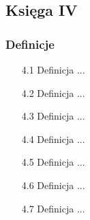 %

\subsection{Księga IV}
\subsubsection{Definicje}
\begin{enumerate}
	\item [4.1] Definicja ...
	\item [4.2] Definicja ...
	\item [4.3] Definicja ...
	\item [4.4] Definicja ...
	\item [4.5] Definicja ...
	\item [4.6] Definicja ...
	\item [4.7] Definicja ...
\end{enumerate}

